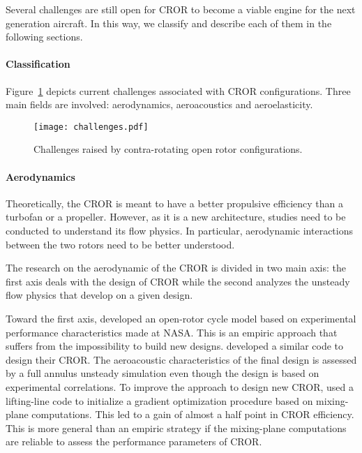 
Several challenges are still open for CROR
to become a viable engine for the next generation aircraft.
In this way, we classify and describe each of them in the following sections.

\paragraph{Classification}
Figure~\ref{fig:cror_challenges} depicts current challenges associated
with CROR configurations. Three main fields are involved: aerodynamics,
aeroacoustics and aeroelasticity.
\begin{figure}[htp]
  \centering
  \texttt{[image: challenges.pdf]}
  \caption{Challenges raised by contra-rotating open rotor configurations.}
  \label{fig:cror_challenges}
\end{figure}

\paragraph{Aerodynamics}
Theoretically, 
the CROR is meant to have a better propulsive efficiency than a turbofan or a
propeller. However, as it is a new architecture, studies need to be conducted
to understand its flow physics. In particular,
aerodynamic interactions between the two rotors need to be better understood.

The research on the aerodynamic of the CROR is divided in two main
axis: the first axis deals with the design of CROR while the second
analyzes the unsteady flow physics that develop on a given design.

Toward the first axis, 
\citet{Hendricks2011} developed an open-rotor cycle model based
on experimental performance characteristics made at NASA. This is 
an empiric approach that suffers from the impossibility to build new designs.
\citet{Peters2012} developed a similar code to design their CROR. The aeroacoustic
characteristics of the final design is assessed by a 
full annulus unsteady simulation even though the design is 
based on experimental correlations.
To improve the approach to design new CROR, 
\citet{Bechet2011} used a lifting-line code to
initialize a gradient optimization procedure based on mixing-plane
computations. This led to a gain of almost a half point
in CROR efficiency. This is more general than an empiric strategy
if the mixing-plane computations are reliable to assess the performance
parameters of CROR. 

